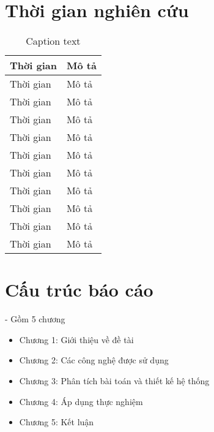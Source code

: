 \documentclass[../thesis.tex]{subfiles}
\begin{document}
\section{Thời gian nghiên cứu}
	\begin{table}[ht!]
		\centering
		\begin{tabular}{|p{5cm}|p{9cm}|}		
			\hline
			Thời gian & Mô tả \\
			\hline
			Thời gian & Mô tả \\
			Thời gian & Mô tả \\
			Thời gian & Mô tả \\
			Thời gian & Mô tả \\
			Thời gian & Mô tả \\
			Thời gian & Mô tả \\
			Thời gian & Mô tả \\			
			Thời gian & Mô tả \\
			Thời gian & Mô tả \\
			Thời gian & Mô tả \\
			\hline
		\end{tabular}
		\caption{Caption text} 
	\end{table}
	
\section{Cấu trúc báo cáo}
	- Gồm 5 chương
	\begin{itemize}
		\item Chương 1: Giới thiệu về đề tài
		\item Chương 2: Các công nghệ được sử dụng
		\item Chương 3: Phân tích bài toán và thiết kế hệ thống
		\item Chương 4: Áp dụng thực nghiệm
		\item Chương 5: Kết luận
	\end{itemize}
	
\end{document}
